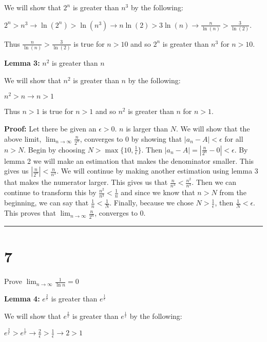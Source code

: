 \documentclass[12pt]{article}
\newcommand{\imp}{\rightarrow}
\newcommand\qedsym{\hfill \rule{2mm}{2mm}}
\begin{document}
We will show that $2^n$ is greater than $n^3$ by the following:

$2^n > n^3
  \imp \ln(2^n) > \ln(n^3)
  \imp n\ln(2) > 3\ln(n)
  \imp \frac{n}{\ln(n)} > \frac{3}{\ln(2)}$.

  Thus $\frac{n}{\ln(n)} > \frac{3}{\ln(2)}$ is true for $n>10$ and so $2^n$ is greater than $n^3$ for $n>10$.

\bigskip

\textbf{Lemma 3:} $n^2$ is greater than $n$

We will show that $n^2$ is greater than $n$ by the following:

$n^2 > n
  \imp n > 1$

  Thus $n>1$ is true for $n>1$ and so $n^2$ is greater than $n$ for $n>1$.

\bigskip

\textbf{Proof:} Let there be given an $\epsilon > 0$. $n$ is larger than $N$. We will show that the above limit, $\lim_{n\to \infty}\frac{n}{2^n}$, converges to $0$ by showing that $|a_n - A| < \epsilon$ for all $n > N$. Begin by choosing $N > \max\{10, \frac{1}{\epsilon}\}$. Then $|a_n - A| = |\frac{n}{2^n} - 0 | < \epsilon$. By lemma 2 we will make an estimation that makes the denominator smaller. This gives us $|\frac{n}{2^n}| < \frac{n}{n^3}$. We will continue by making another estimation using lemma 3 that makes the numerator larger. This gives us that $\frac{n}{n^3} < \frac{n^2}{n^3}$. Then we can continue to transform this by $\frac{n^2}{n^3} < \frac{1}{n}$ and since we know that $n > N$ from the beginning, we can say that $\frac{1}{n} < \frac{1}{N}$. Finally, because we chose $N > \frac{1}{\epsilon}$, then $\frac{1}{N} < \epsilon$. This proves that $\lim_{n\to \infty}\frac{n}{2^n}$, converges to $0$.

\qedsym{}

\section*{7}
Prove $\lim_{n\to \infty}\frac{1}{\ln n} = 0$

\bigskip

\textbf{Lemma 4:} $e^{\frac{2}{\epsilon}}$ is greater than $e^{\frac{1}{\epsilon}}$

We will show that $e^{\frac{2}{\epsilon}}$ is greater than $e^{\frac{1}{\epsilon}}$ by the following:

$e^{\frac{2}{\epsilon}} > e^{\frac{1}{\epsilon}}
  \imp \frac{2}{\epsilon} > \frac{1}{\epsilon}
  \imp 2 > 1$
\end{document}
